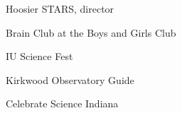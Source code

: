 
\begin{cventries}

  \cventry
    {} %
    {} %
    {} %
    {} %
    {
      \begin{cvitems} %
	\item{Hoosier STARS, director}
        \item {Brain Club at the Boys and Girls Club}
	\item{IU Science Fest}
	\item{Kirkwood Observatory Guide}
	\item{Celebrate Science Indiana}
      \end{cvitems}
    }

\end{cventries}

	




